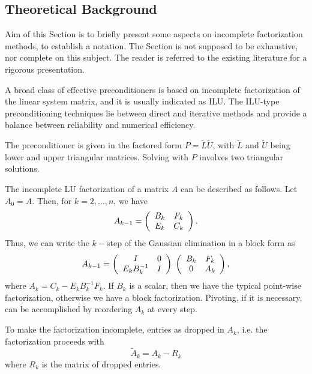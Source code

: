 
\subsection{Theoretical Background}
\label{sec:ifpack_theoretical}

Aim of this Section is to briefly present some aspects on incomplete
factorization methods, to establish a notation. The Section is not
supposed to be exhaustive, nor complete on this subject. The reader is
referred to the existing literature for a rigorous presentation.

\medskip

A broad class of effective preconditioners is based on incomplete
factorization of the linear system matrix, and it is usually indicated
as ILU.  The ILU-type preconditioning techniques lie between direct and
iterative methods and provide a balance between reliability and
numerical efficiency.

The preconditioner is given in the factored form
$P=\tilde{L} \tilde{U}$, with $\tilde{L}$ and $\tilde{U}$ being lower
and upper triangular matrices. Solving with $P$ involves two triangular
solutions.

The incomplete LU factorization of a matrix $A$ can be described as
follows. Let $A_0=A$. Then, for $k=2,\ldots,n$, we have
\[
A_{k-1} = 
\left(
\begin{array}{c c}
B_k & F_k \\
E_k & C_k \\
\end{array}
\right) .
\]
Thus, we can write the $k-$step of the Gaussian elimination in a block
form as
\[
A_{k-1} = 
\left(
\begin{array}{c c}
I & 0 \\
E_k B_k^{-1} & I \\
\end{array}
\right)
\;
\left(
\begin{array}{c c}
B_k & F_k \\
0 & A_k \\
\end{array}
\right) ,
\]
where $A_k = C_k - E_k B_k^{-1} F_k$. If $B_k$ is a scalar, then we have
the typical point-wise factorization, otherwise we have a block
factorization. Pivoting, if it is necessary, can be accomplished by
reordering $A_k$ at every step.

To make the factorization incomplete, entries as dropped in $A_k$, i.e.
the factorization proceeds with
\[
\tilde{A}_k = A_k - R_k
\]
where $R_k$ is the matrix of dropped entries. 


